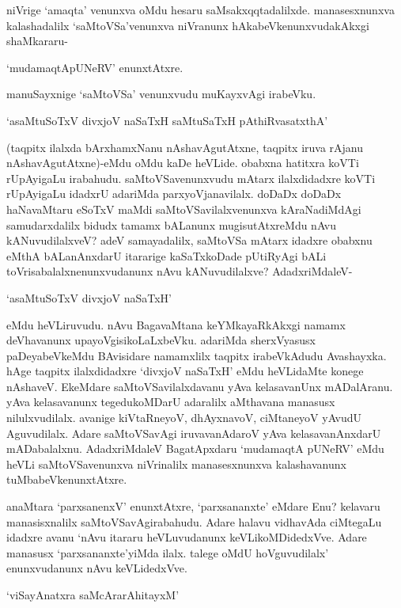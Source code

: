 niVrige `amaqta' venunxva oMdu hesaru saMsakxqqtadalilxde. manasesxnunxva kalashadalilx `saMtoVSa'venunxva niVranunx hAkabeVkenunxvudakAkxgi shaMkararu-

\begin{center}
`mudamaqtApUNeRV' enunxtAtxre.
\end{center}

manuSayxnige `saMtoVSa' venunxvudu muKayxvAgi irabeVku.

\begin{shloka}
`asaMtuSoTxV divxjoV naSaTxH saMtuSaTxH pAthiRvasatxthA'
\end{shloka}

(taqpitx ilalxda bArxhamxNanu nAshavAgutAtxne, taqpitx iruva rAjanu nAshavAgutAtxne)-eMdu oMdu kaDe heVLide. obabxna hatitxra koVTi rUpAyigaLu irabahudu. saMtoVSavenunxvudu mAtarx ilalxdidadxre koVTi rUpAyigaLu idadxrU adariMda parxyoVjanavilalx. doDaDx doDaDx haNavaMtaru eSoTxV maMdi saMtoVSavilalxvenunxva kAraNadiMdAgi samudarxdalilx bidudx tamamx bALanunx mugisutAtxreMdu nAvu kANuvudilalxveV? adeV samayadalilx, saMtoVSa mAtarx idadxre obabxnu eMthA bALanAnxdarU itararige kaSaTxkoDade pUtiRyAgi bALi toVrisabalalxnenunxvudanunx nAvu kANuvudilalxve? AdadxriMdaleV-

\begin{shloka}
`asaMtuSoTxV divxjoV naSaTxH'
\end{shloka}

\noindent eMdu heVLiruvudu. nAvu BagavaMtana keYMkayaRkAkxgi namamx deVhavanunx upayoVgisikoLaLxbeVku. adariMda sherxVyasusx paDeyabeVkeMdu BAvisidare namamxlilx taqpitx irabeVkAdudu Avashayxka. hAge taqpitx ilalxdidadxre `divxjoV naSaTxH' eMdu heVLidaMte konege nAshaveV. EkeMdare saMtoVSavilalxdavanu yAva kelasavanUnx mADalAranu. yAva kelasavanunx tegedukoMDarU adaralilx aMthavana manasusx nilulxvudilalx. avanige kiVtaRneyoV, dhAyxnavoV, ciMtaneyoV yAvudU Aguvudilalx. Adare saMtoVSavAgi iruvavanAdaroV yAva kelasavanAnxdarU mADabalalxnu. AdadxriMdaleV BagatApxdaru `mudamaqtA pUNeRV' eMdu heVLi saMtoVSavenunxva niVrinalilx manasesxnunxva kalashavanunx tuMbabeVkenunxtAtxre.

anaMtara `parxsanenxV' enunxtAtxre, `parxsananxte' eMdare Enu? kelavaru manasisxnalilx saMtoVSavAgirabahudu. Adare halavu vidhavAda ciMtegaLu idadxre avanu `nAvu itararu heVLuvudanunx keVLikoMDidedxVve. Adare manasusx `parxsananxte'yiMda ilalx. talege oMdU hoVguvudilalx' enunxvudanunx nAvu keVLidedxVve.

\begin{shloka}
`viSayAnatxra saMcArarAhitayxM'
\end{shloka}

